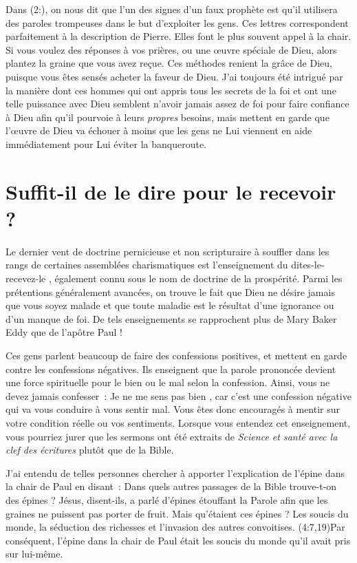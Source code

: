 Dans (2:), on nous dit que l'un des signes
 d'un faux prophète est qu'il utilisera des paroles trompeuses
 dans le but d'ex\-ploi\-ter les gens. Ces lettres correspondent parfaitement
 à la description de Pierre. Elles font le plus souvent appel à la chair.
 Si vous voulez des réponses à vos prières, ou une œuvre spéciale de Dieu,
 alors plantez la graine que vous avez reçue.
 Ces méthodes renient la grâce de Dieu, puisque vous êtes sensés acheter
 la faveur de Dieu. J'ai toujours été intrigué par la manière dont
 ces hommes qui ont appris tous les secrets de la foi
 et ont une telle puissance avec Dieu semblent n'avoir jamais assez
 de foi pour faire confiance à Dieu afin qu'il pourvoie
 à leurs \emph{propres} besoins, mais mettent en garde que l'œuvre de Dieu
 va échouer à moins que les gens ne Lui viennent en aide
 immédiatement pour Lui éviter la banqueroute.


\section{Suffit-il de le dire pour le recevoir ?}

Le dernier vent de doctrine pernicieuse et non scripturaire à souffler
 dans les rangs de certaines assemblées charismatiques
 est l'en\-sei\-gne\-ment du \og dites-le-recevez-le \fg{},
 également connu sous le nom de doctrine de la prospérité.
 Parmi les prétentions généralement avancées, on trouve le fait
 que Dieu ne désire jamais que vous soyez malade et que toute maladie
 est le résultat d'une ignorance ou d'un manque de foi.
 De tels enseignements se rapprochent plus de Mary Baker Eddy
 que de l'apôtre Paul !

Ces gens parlent beaucoup de faire des confessions positives,
 et mettent en garde contre les confessions négatives.
 Ils enseignent que la parole prononcée devient une force spirituelle
 pour le bien ou le mal selon la confession.
 Ainsi, vous ne devez jamais confesser~: \og Je ne me sens pas bien \fg{},
 car c'est une confession négative qui va vous conduire à vous sentir mal.
 Vous êtes donc encouragés à mentir sur votre condition réelle
 ou vos sentiments. Lorsque vous entendez cet enseignement,
 vous pourriez jurer que les sermons ont été extraits
 de \emph{Science et santé avec la clef des écritures}
  plutôt que de la Bible.
 \nowidow

J'ai entendu de telles personnes chercher à apporter l'explication
 de l'épine dans la chair de Paul en disant~:
 \og Dans quels autres passages de la Bible trouve-t-on des épines ? \fg{}
 \og Jésus, disent-ils, a parlé d'épines étouffant la Parole afin
 que les graines ne puissent pas porter de fruit. \fg{}
 Mais qu'étaient ces épines ? Les soucis du monde,
 la séduction des richesses et l'invasion des autres convoitises.
 (4:7,19)Par conséquent, l'épine dans la chair de Paul
 était les soucis du monde qu'il avait pris sur lui-même.

